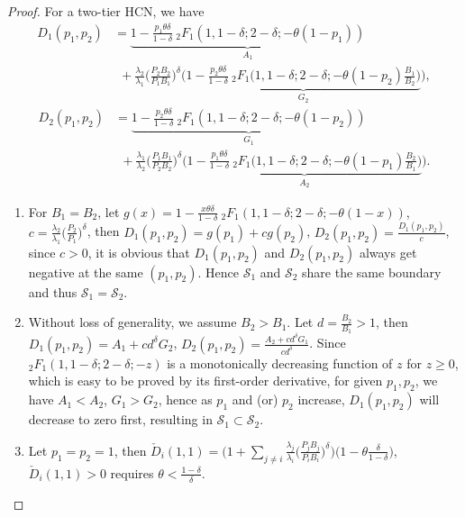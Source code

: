 \documentclass[12pt,draftclsnofoot,journal,onecolumn]{IEEEtran}
\begin{document}
\begin{proof}
	For a two-tier HCN, we have
	\begin{align}\label{eq:D_1st}
	D_1(p_1,p_2) &= \underbrace{1-\frac{p_1\theta\delta}{1-\delta} \:_2F_1(1,1-\delta;2-\delta;-\theta(1-p_1))}_{A_1} \nonumber\\
	&~~+ \frac{\lambda_2}{\lambda_1}\Big(\frac{P_2B_2}{P_1B_1}\Big)^\delta \bigg(\underbrace{1-\frac{p_2\theta\delta}{1-\delta} \:_2F_1\Big(1,1-\delta;2-\delta;-\theta(1-p_2)\frac{B_1}{B_2}\Big)}_{G_2}\bigg),
	\end{align}
	\begin{align}\label{eq:D_2nd}
	D_2(p_1,p_2) &= \underbrace{1-\frac{p_2\theta\delta}{1-\delta} \:_2F_1(1,1-\delta;2-\delta;-\theta(1-p_2))}_{G_1} \nonumber\\
	&~~+ \frac{\lambda_1}{\lambda_2}\Big(\frac{P_1B_1}{P_2B_2}\Big)^\delta \bigg(\underbrace{1-\frac{p_1\theta\delta}{1-\delta} \:_2F_1\Big(1,1-\delta;2-\delta;-\theta(1-p_1)\frac{B_2}{B_1}\Big)}_{A_2}\bigg).
	\end{align}
	\begin{enumerate}[(1)]
		\item For $B_1=B_2$, let $g(x) = 1-\frac{x\theta\delta}{1-\delta} \:_2F_1(1,1-\delta;2-\delta;-\theta(1-x))$, $c=\frac{\lambda_2}{\lambda_1}\big(\frac{P_2}{P_1}\big)^\delta$, then $D_1(p_1,p_2) = g(p_1) + cg(p_2)$, $D_2(p_1,p_2) = \frac{D_1(p_1,p_2)}{c}$, since $c>0$, it is obvious that $D_1(p_1,p_2)$ and $D_2(p_1,p_2)$ always get negative at the same $(p_1,p_2)$. Hence $\mathcal{S}_1$ and $\mathcal{S}_2$ share the same boundary and thus $\mathcal{S}_1=\mathcal{S}_2$. 
		\item Without loss of generality, we assume $B_2>B_1$. Let $d=\frac{B_2}{B_1}>1$, then $D_1(p_1,p_2) = A_1+cd^\delta G_2$, $D_2(p_1,p_2) = \frac{A_2+cd^\delta G_1}{cd^\delta}$. Since $_2F_1(1,1-\delta;2-\delta;-z)$ is a monotonically decreasing function of $z$ for $z\geq0$, which is easy to be proved by its first-order derivative, for given $p_1, p_2$, we have $A_1<A_2$, $G_1>G_2$, hence as $p_1$ and (or) $p_2$ increase, $D_1(p_1,p_2)$ will decrease to zero first, resulting in $\mathcal{S}_1\subset\mathcal{S}_2$.  
		\item Let $p_1=p_2=1$, then $\check D_i(1,1) = \big(1+\sum_{j\neq i} \frac{\lambda_j}{\lambda_i} \big(\frac{P_j B_j}{P_i B_i}\big)^\delta\big) \big(1-\theta\frac{\delta}{1-\delta}\big)$, $\check D_i(1,1)>0$ requires $\theta<\frac{1-\delta}{\delta}$. 
	\end{enumerate}\vspace{-0.8cm}
\end{proof}
\end{document}
